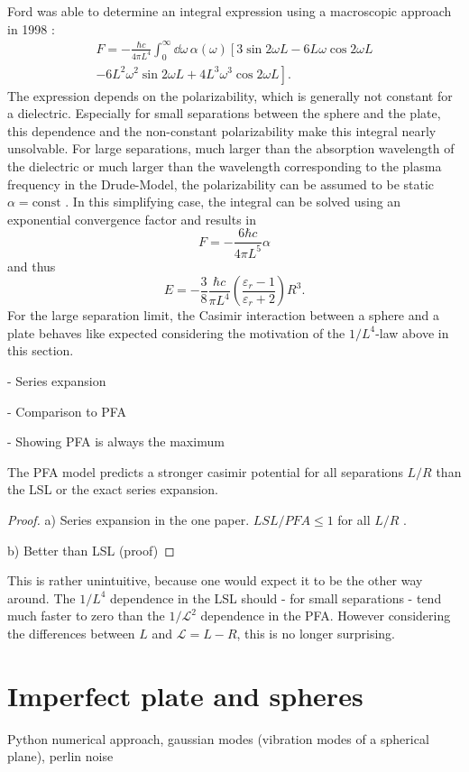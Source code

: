 Ford was able to determine an integral expression using a macroscopic approach in 1998 \cite{Ford_1998}:
\begin{multline}
  F = - \frac{\hbar c}{4 \pi L^4} \int_{0}^{\infty} \dd \omega \, \alpha(\omega) \left[3\sin 2 \omega L - 6L\omega \cos 2 \omega L \right. \\ 
  \left. - 6L^2\omega^2 \sin 2 \omega L + 4L^3\omega^3 \cos 2 \omega L\right].
\end{multline}
The expression depends on the polarizability, which is generally not constant for a dielectric. Especially for small separations between the sphere and the plate, this dependence and the non-constant polarizability make this integral nearly unsolvable.
For large separations, much larger than the absorption wavelength of the dielectric or much larger than the wavelength corresponding to the plasma frequency in the Drude-Model, the polarizability can be assumed to be static $\alpha=\mathrm{const}$ \cite{Ford_1998,Kamp_2020}. In this simplifying case, the integral can be solved using an exponential convergence factor and results in
\begin{equation}
  F = -\frac{6 \hbar c}{4 \pi L^5} \alpha
\end{equation}
and thus 
\begin{equation}
  E = -\frac{3}{8}\frac{\hbar c}{\pi L^4} \left(\frac{\varepsilon_r - 1}{\varepsilon_r + 2}\right)R^3 .
\end{equation}
For the large separation limit, the Casimir interaction between a sphere and a plate behaves like expected considering the motivation of the $1/L^4$-law above in this section.


- Series expansion

- Comparison to PFA

- Showing PFA is always the maximum

\begin{theorem}
  The PFA model predicts a stronger casimir potential for all separations $L/R$ than the LSL or the exact series expansion.
\end{theorem}
\begin{proof}
  a) Series expansion in the one paper. $LSL/PFA \leq 1$ for all $L/R$ \cite{Emig_2007a}.

  b) Better than LSL (proof)
\end{proof}
\begin{remark}
  This is rather unintuitive, because one would expect it to be the other way around. The $1/L^4$ dependence in the LSL should - for small separations - tend much faster to zero than the $1/\mathscr{L}^2$ dependence in the PFA. However considering the differences between $L$ and $\mathscr{L} = L-R$, this is no longer surprising.
\end{remark}


\section{Imperfect plate and spheres}
\label{sec:3:imperfect-plates}

Python numerical approach, gaussian modes (vibration modes of a spherical plane), perlin noise




